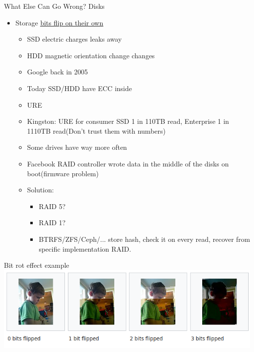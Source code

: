 \documentclass{beamer}
\begin{document}
\begin{frame}{What Else Can Go Wrong? Disks}
	\begin{itemize}
		\item Storage \underline{\textcolor{red}{\href{https://en.wikipedia.org/wiki/Data_degradation\#In_storage}{bits flip on their own}}}
		\begin{itemize}
			\item SSD electric charges leaks away 
			\item HDD magnetic orientation change changes
			\item Google back in 2005 
			\item Today SSD/HDD have ECC inside
			\item URE 
			\item Kingston: URE for consumer SSD 1 in 110TB read, Enterprise 1 in 1110TB read(Don't trust them with numbers)
			\item Some drives have way more often
			\item Facebook RAID controller wrote data in the middle of the disks on boot(firmware problem)
			\item Solution:
			\begin{itemize}
				\item RAID 5?
				\item RAID 1?
				\item BTRFS/ZFS/Ceph/... store hash, check it on every read, recover from specific implementation RAID.
			\end{itemize}
		\end{itemize}
	\end{itemize}
\end{frame}



\begin{frame}{Bit rot effect example}
	\includegraphics[scale=.7]{bitrot_example.png}
\end{frame}
\end{document}
